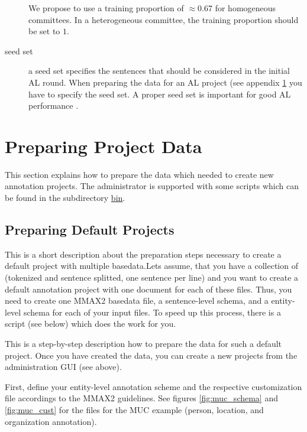 \documentclass[DIV12,english,11pt,halfparskip]{scrartcl}
\begin{document}
\begin{appendix}
\begin{description}
  We propose to use a training proportion of $\approx 0.67$ for
  homogeneous committees. In a heterogeneous committee, the training
  proportion should be set to $1$.


\item[seed set] a seed set specifies the sentences that should be
  considered in the initial AL round. When preparing the data for an
  AL project (see appendix \ref{appendix:preparation} you have to
  specify the seed set. A proper seed set is important for good AL
  performance \cite{Tomanek2007law}.

\end{description}



\section{Preparing Project Data}
\label{appendix:preparation}


This section explains how to prepare the data which needed to create
new annotation projects. The administrator is supported with some
scripts which can be found in the subdirectory \url{bin}.

\subsection{Preparing Default Projects}


This is a short description about the preparation steps necessary to
create a default project with multiple basedata.Lets assume, that you
have a collection of (tokenized and sentence splitted, one sentence
per line) and you want to create a default annotation project with one
document for each of these files. Thus, you need to create one MMAX2
basedata file, a sentence-level schema, and a entity-level schema for
each of your input files. To speed up this process, there is a script
(see below) which does the work for you.

This is a step-by-step description how to prepare the data for such a
default project. Once you have created the data, you can create a new
projects from the administration GUI (see above). 

First, define your entity-level annotation scheme and the respective
customization file accordings to the MMAX2 guidelines. See figures
\ref{fig:muc_schema} and \ref{fig:muc_cust} for the files for the MUC
example (person, location, and organization annotation).


\end{appendix}
\end{document}
